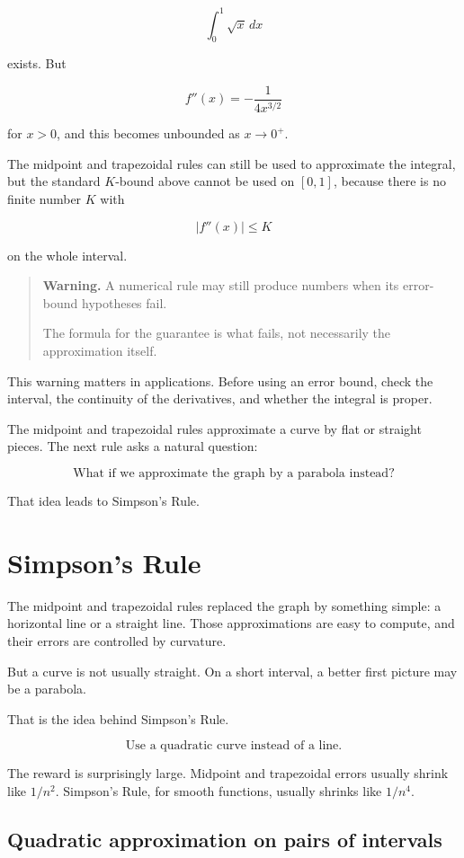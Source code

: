 \[
\int_0^1 \sqrt{x}\,dx
\]

exists.  But

\[
f''(x)=-\frac{1}{4x^{3/2}}
\]

for \(x>0\), and this becomes unbounded as \(x\to0^+\).

The midpoint and trapezoidal rules can still be used to approximate the integral, but the
standard \(K\)-bound above cannot be used on \([0,1]\), because there is no finite number
\(K\) with

\[
|f''(x)|\le K
\]

on the whole interval.

\begin{quote}
\textbf{Warning.}
A numerical rule may still produce numbers when its error-bound hypotheses fail.

The formula for the guarantee is what fails, not necessarily the approximation itself.
\end{quote}

This warning matters in applications.  Before using an error bound, check the interval,
the continuity of the derivatives, and whether the integral is proper.

The midpoint and trapezoidal rules approximate a curve by flat or straight pieces.  The
next rule asks a natural question:

\[
\boxed{
\text{What if we approximate the graph by a parabola instead?}
}
\]

That idea leads to Simpson's Rule.
\section{Simpson's Rule}
\label{sec:simpsons-rule}

The midpoint and trapezoidal rules replaced the graph by something simple: a
horizontal line or a straight line.  Those approximations are easy to compute, and
their errors are controlled by curvature.

But a curve is not usually straight.  On a short interval, a better first picture may be a
parabola.

That is the idea behind Simpson's Rule.

\[
\boxed{
\text{Use a quadratic curve instead of a line.}
}
\]

The reward is surprisingly large.  Midpoint and trapezoidal errors usually shrink like
\(1/n^2\).  Simpson's Rule, for smooth functions, usually shrinks like \(1/n^4\).

\subsection{Quadratic approximation on pairs of intervals}
\label{subsec:quadratic-approximation-pairs-intervals}

